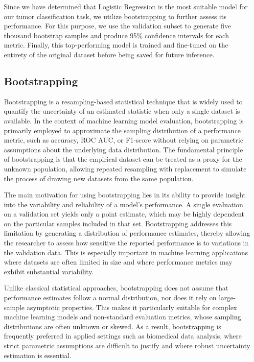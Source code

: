 \documentclass[en]{dimscthesis}
\begin{document}
Since we have determined that Logistic Regression is the most suitable model for our tumor classification task, we utilize bootstrapping to further assess its performance. For this purpose, we use the validation subset to generate five thousand bootstrap samples and produce 95\% confidence intervals for each metric. Finally, this top-performing model is trained and fine-tuned on the entirety of the original dataset before being saved for future inference.

\subsection{Bootstrapping} \label{bootstrap}

Bootstrapping is a resampling-based statistical technique that is widely used to quantify the uncertainty of an estimated statistic when only a single dataset is available. In the context of machine learning model evaluation, bootstrapping is primarily employed to approximate the sampling distribution of a performance metric, such as accuracy, ROC AUC,  or F1-score without relying on parametric assumptions about the underlying data distribution. The fundamental principle of bootstrapping is that the empirical dataset can be treated as a proxy for the unknown population, allowing repeated resampling with replacement to simulate the process of drawing new datasets from the same population.

The main motivation for using bootstrapping lies in its ability to provide insight into the variability and reliability of a model’s performance. A single evaluation on a validation set yields only a point estimate, which may be highly dependent on the particular samples included in that set. Bootstrapping addresses this limitation by generating a distribution of performance estimates, thereby allowing the researcher to assess how sensitive the reported performance is to variations in the validation data. This is especially important in machine learning applications where datasets are often limited in size and where performance metrics may exhibit substantial variability.

Unlike classical statistical approaches, bootstrapping does not assume that performance estimates follow a normal distribution, nor does it rely on large-sample asymptotic properties. This makes it particularly suitable for complex machine learning models and non-standard evaluation metrics, whose sampling distributions are often unknown or skewed. As a result, bootstrapping is frequently preferred in applied settings such as biomedical data analysis, where strict parametric assumptions are difficult to justify and where robust uncertainty estimation is essential.
\end{document}
